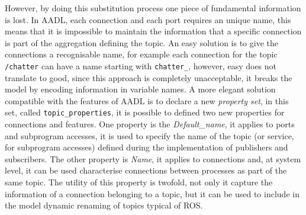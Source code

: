 However, by doing this substitution process one piece of fundamental information is lost. In AADL, each connection and each port requires an unique name, this means that it is impossible to maintain the information that a specific connection is part of the aggregation defining the topic. An easy solution is to give the connections a recognisable name, for example each connection for the topic \texttt{/chatter} can have a name starting with \texttt{chatter\_}, however, easy does not translate to good, since this approach is completely unacceptable, it breaks the model by encoding information in variable names. A more elegant solution compatible with the features of AADL is to declare a new \textit{property set}, in this set, called \texttt{topic\_properties}, it is possible to defined two new properties for connections and features. One property is the \textit{Default\_name}, it applies to ports and subprogram accesses, it is used to specify the name of the topic (or service, for subprogram accesses) defined during the implementation of publishers and subscribers. The other property is \textit{Name}, it applies to connections and, at system level, it can be used characterise connections between processes as part of the same topic. The utility of this property is twofold, not only it capture the information of a connection belonging to a topic, but it can be used to include in the model dynamic renaming of topics typical of ROS.

